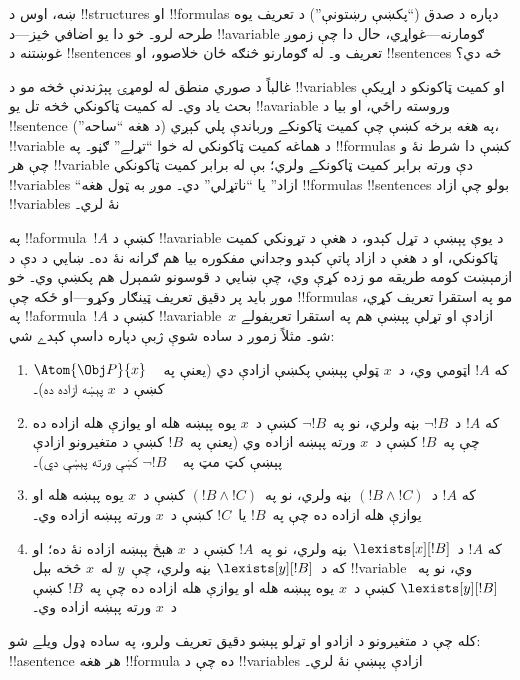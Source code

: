 \documentclass[../../../include/open-logic-section]{subfiles}
\begin{document}


ښه، اوس د !!{structure}s او !!{formula}s دپاره د صدق (``پکښې
رښتونې'') د تعريف يوه طرحه لرو۔ خو دا يو اضافي څيز---د
!!a{variable} ګومارنه---غواړي، حال دا چې زموږ غوښتنه د
!!{sentence}s تعريف و۔ له ګومارنو څنګه ځان خلاصوو، او !!{sentence}s
څه دي؟

غالباً د صوري منطق له لومړۍ پېژندنې څخه مو د !!{variable}s او کميت
ټاکونکو د اړيکې بحث ياد وي۔ له کميت ټاکونکي څخه تل يو !!a{variable}
وروسته راځي، او بيا د !!{sentence} په هغه برخه کښې چې کميت ټاکونکے
ورباندې پلي کېږي (د هغه ``ساحه'')، !!{variable} د هماغه کميت ټاکونکي
له خوا ``تړلے'' ګڼو۔ په !!{formula}s کښې دا شرط نۀ و چې هر
!!{variable} دې ورته برابر کميت ټاکونکے ولري؛ بې له برابر کميت
ټاکونکي !!{variable}s ``ازاد'' يا ``ناتړلي'' دي۔ موږ به ټول هغه
!!{formula}s !!{sentence}s بولو چې ازاد !!{variable}s نۀ لري۔

په !!a{formula}~$!A$ کښې د !!a{variable} د يوې پېښې د تړل کېدو، د
هغې د تړونکي کميت ټاکونکي، او د هغې د ازاد پاتې کېدو وجداني مفکوره
بيا هم ګرانه نۀ ده۔ ښايي د دې د ازمېښت کومه طريقه مو زده کړې وي،
چې ښايي د قوسونو شمېرل هم پکښې وي۔ خو موږ بايد پر دقيق تعريف ټينګار
وکړو---او ځکه چې !!{formula}s مو په استقرا تعريف کړي، په
!!a{formula}~$!A$ کښې د !!a{variable}~$x$ ازادې او تړلې پېښې هم په
استقرا تعريفولے شو۔ مثلاً زموږ د ساده شوې ژبې دپاره داسې کېدے شي:
\begin{enumerate}
  \item که $!A$ اټومي وي، د~$x$ ټولې پېښې پکښې ازادې دي (يعنې په
  ~ $\Atom{\Obj P}{x}$ کښې د~$x$ پېښه ازاده ده)۔
  \item که $!A$ د~$\lnot !B$ بڼه ولري، نو په~$\lnot !B$ کښې د~$x$
  يوه پېښه هله او يوازې هله ازاده ده چې په~$!B$ کښې د~$x$ ورته
  پېښه ازاده وي (يعنې په~$!B$ کښې د متغيرونو ازادې پېښې کټ مټ په
  ~ $\lnot !B$ کښې ورته پېښې دي)۔
  \item که $!A$ د~$(!B \land !C)$ بڼه ولري، نو په~$(!B \land !C)$
  کښې د~$x$ يوه پېښه هله او يوازې هله ازاده ده چې په~$!B$ يا~$!C$
  کښې د~$x$ ورته پېښه ازاده وي۔
  \item که $!A$ د~$\lexists[x][!B]$ بڼه ولري، نو په~$!A$ کښې د~$x$
  هېڅ پېښه ازاده نۀ ده؛ او که د~$\lexists[y][!B]$ بڼه ولري، چې~$y$
  له~$x$ څخه بېل !!{variable} وي، نو په~$\lexists[y][!B]$ کښې د~$x$
  يوه پېښه هله او يوازې هله ازاده ده چې په~$!B$ کښې د~$x$ ورته
  پېښه ازاده وي۔
\end{enumerate}

کله چې د متغيرونو د ازادو او تړلو پېښو دقيق تعريف ولرو، په ساده
ډول ويلے شو: !!a{sentence} هر هغه !!{formula} ده چې د
!!{variable}s ازادې پېښې نۀ لري۔
\end{document}
